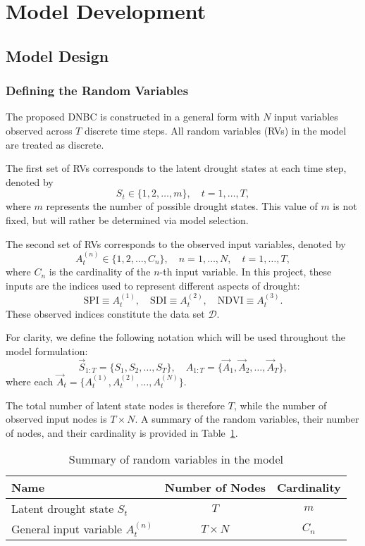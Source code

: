 \section{Model Development}
\label{sec:model_development}
\subsection{Model Design}
\label{sec:model_design}

\subsubsection{Defining the Random Variables}

The proposed DNBC is constructed in a general form with $N$ input variables observed across $T$ discrete time steps. All random variables (RVs) in the model are treated as discrete.  

The first set of RVs corresponds to the latent drought states at each time step, denoted by
\[
S_t \in \{1,2,\dots,m\}, \quad t = 1, \dots, T,
\]
where $m$ represents the number of possible drought states. This value of $m$ is not fixed, but will rather be determined via model selection.  

The second set of RVs corresponds to the observed input variables, denoted by
\[
A_t^{(n)} \in \{1,2,\dots,C_n\}, \quad n = 1, \dots, N, \quad t = 1, \dots, T,
\]
where $C_n$ is the cardinality of the $n$-th input variable. In this project, these inputs are the indices used to represent different aspects of drought:
\[
\text{SPI} \equiv A_t^{(1)}, \quad 
\text{SDI} \equiv A_t^{(2)}, \quad 
\text{NDVI} \equiv A_t^{(3)}.
\]
These observed indices constitute the data set $\mathcal{D}$.  

For clarity, we define the following notation which will be used throughout the model formulation:
\[
\vec{S}_{1:T} = \{S_1, S_2, \dots, S_T\}, \quad 
A_{1:T} = \{\vec{A}_1, \vec{A}_2, \dots, \vec{A}_T\},
\]
where each $\vec{A}_t = \{A_t^{(1)}, A_t^{(2)}, \dots, A_t^{(N)}\}$.  

The total number of latent state nodes is therefore $T$, while the number of observed input nodes is $T \times N$. A summary of the random variables, their number of nodes, and their cardinality is provided in Table~\ref{tab:RVs}.

\begin{table}[H]
\centering
\caption{Summary of random variables in the model}
\label{tab:RVs}
\begin{tabular}{lcc}
\hline
\textbf{Name} & \textbf{Number of Nodes} & \textbf{Cardinality} \\ \hline
Latent drought state $S_t$ & $T$ & $m$ \\
General input variable $A_t^{(n)}$ & $T \times N$ & $C_n$ \\
\hline
\end{tabular}
\end{table}

